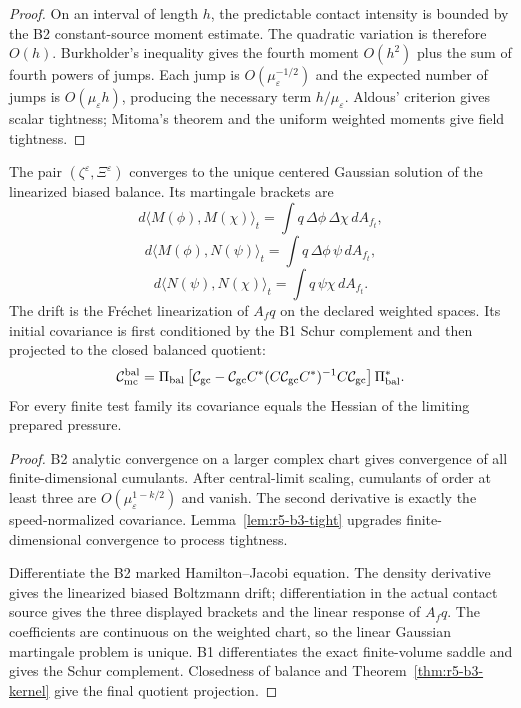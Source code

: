\begin{proof}
On an interval of length \(h\), the predictable contact intensity is bounded
by the B2 constant-source moment estimate.  The quadratic variation is
therefore \(O(h)\).  Burkholder's inequality gives the fourth moment
\(O(h^2)\) plus the sum of fourth powers of jumps.  Each jump is
\(O(\mu_\varepsilon^{-1/2})\) and the expected number of jumps is
\(O(\mu_\varepsilon h)\), producing the necessary term
\(h/\mu_\varepsilon\).  Aldous' criterion gives scalar tightness; Mitoma's
theorem and the uniform weighted moments give field tightness.
\end{proof}

\begin{theorem}
\label{thm:r5-b3-gaussian}
The pair \((\zeta^\varepsilon,\Xi^\varepsilon)\) converges to the unique
centered Gaussian solution of the linearized biased balance.  Its martingale
brackets are
\[
 d\langle M(\phi),M(\chi)\rangle_t
 =\int q\,\Delta\phi\,\Delta\chi\,dA_{f_t},
\]
\[
 d\langle M(\phi),N(\psi)\rangle_t
 =\int q\,\Delta\phi\,\psi\,dA_{f_t},
\]
\[
 d\langle N(\psi),N(\chi)\rangle_t
 =\int q\,\psi\chi\,dA_{f_t}.
\]
The drift is the Fr\'echet linearization of \(A_fq\) on the declared weighted
spaces.  Its initial covariance is first conditioned by the B1 Schur
complement and then projected to the closed balanced quotient:
\[
 \mathcal C_{\rm mc}^{\rm bal}=
 \Pi_{\rm bal}
 \left[
  \mathcal C_{\rm gc}-
  \mathcal C_{\rm gc}C^*(C\mathcal C_{\rm gc}C^*)^{-1}
  C\mathcal C_{\rm gc}
 \right]
 \Pi_{\rm bal}^*.
\]
For every finite test family its covariance equals the Hessian of the limiting
prepared pressure.
\end{theorem}

\begin{proof}
B2 analytic convergence on a larger complex chart gives convergence of all
finite-dimensional cumulants.  After central-limit scaling, cumulants of
order at least three are
\(O(\mu_\varepsilon^{1-k/2})\) and vanish.  The second derivative is exactly
the speed-normalized covariance.  Lemma~\ref{lem:r5-b3-tight} upgrades
finite-dimensional convergence to process tightness.

Differentiate the B2 marked Hamilton--Jacobi equation.  The density derivative
gives the linearized biased Boltzmann drift; differentiation in the actual
contact source gives the three displayed brackets and the linear response of
\(A_fq\).  The coefficients are continuous on the weighted chart, so the
linear Gaussian martingale problem is unique.  B1 differentiates the exact
finite-volume saddle and gives the Schur complement.  Closedness of balance
and Theorem~\ref{thm:r5-b3-kernel} give the final quotient projection.
\end{proof}

